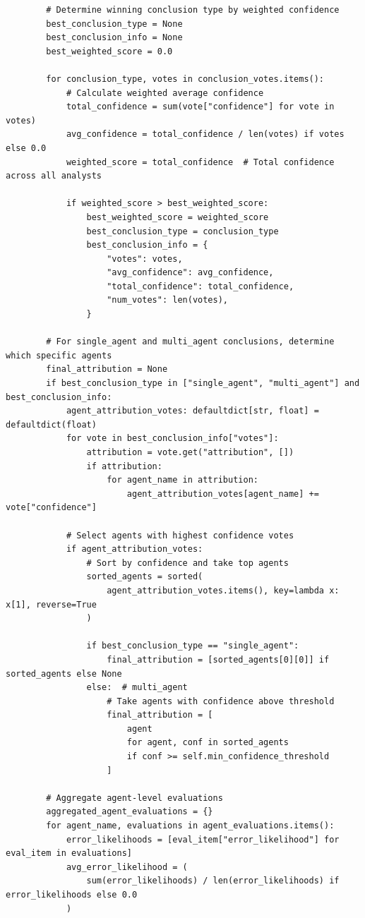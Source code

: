 \documentclass{article}
\begin{document}
\begin{lstlisting}
        # Determine winning conclusion type by weighted confidence
        best_conclusion_type = None
        best_conclusion_info = None
        best_weighted_score = 0.0

        for conclusion_type, votes in conclusion_votes.items():
            # Calculate weighted average confidence
            total_confidence = sum(vote["confidence"] for vote in votes)
            avg_confidence = total_confidence / len(votes) if votes else 0.0
            weighted_score = total_confidence  # Total confidence across all analysts

            if weighted_score > best_weighted_score:
                best_weighted_score = weighted_score
                best_conclusion_type = conclusion_type
                best_conclusion_info = {
                    "votes": votes,
                    "avg_confidence": avg_confidence,
                    "total_confidence": total_confidence,
                    "num_votes": len(votes),
                }

        # For single_agent and multi_agent conclusions, determine which specific agents
        final_attribution = None
        if best_conclusion_type in ["single_agent", "multi_agent"] and best_conclusion_info:
            agent_attribution_votes: defaultdict[str, float] = defaultdict(float)
            for vote in best_conclusion_info["votes"]:
                attribution = vote.get("attribution", [])
                if attribution:
                    for agent_name in attribution:
                        agent_attribution_votes[agent_name] += vote["confidence"]

            # Select agents with highest confidence votes
            if agent_attribution_votes:
                # Sort by confidence and take top agents
                sorted_agents = sorted(
                    agent_attribution_votes.items(), key=lambda x: x[1], reverse=True
                )

                if best_conclusion_type == "single_agent":
                    final_attribution = [sorted_agents[0][0]] if sorted_agents else None
                else:  # multi_agent
                    # Take agents with confidence above threshold
                    final_attribution = [
                        agent
                        for agent, conf in sorted_agents
                        if conf >= self.min_confidence_threshold
                    ]

        # Aggregate agent-level evaluations
        aggregated_agent_evaluations = {}
        for agent_name, evaluations in agent_evaluations.items():
            error_likelihoods = [eval_item["error_likelihood"] for eval_item in evaluations]
            avg_error_likelihood = (
                sum(error_likelihoods) / len(error_likelihoods) if error_likelihoods else 0.0
            )


\end{lstlisting}
\end{document}
